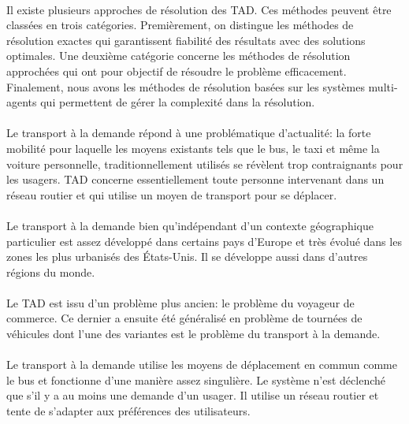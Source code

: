 \documentclass{article}
\begin{document}
\paragraph{}
Il existe plusieurs approches de résolution des TAD. Ces méthodes peuvent être classées en trois catégories. Premièrement, on distingue les méthodes de résolution exactes qui garantissent fiabilité des résultats avec des solutions optimales. Une deuxième catégorie concerne les méthodes de résolution approchées qui ont pour objectif de résoudre le problème efficacement. Finalement, nous avons les méthodes de résolution basées sur les systèmes multi-agents qui permettent de gérer la complexité dans la résolution.

\paragraph{}
Le transport à la demande répond à une problématique d’actualité: la forte mobilité pour laquelle les moyens existants tels que le bus, le taxi et même la voiture personnelle, traditionnellement utilisés se révèlent trop contraignants pour les usagers. TAD concerne essentiellement toute personne intervenant dans un réseau routier et qui utilise un moyen de transport pour se déplacer.

\paragraph{}
Le transport à la demande bien qu'indépendant d'un contexte géographique particulier est assez développé dans certains pays d'Europe et très évolué dans les zones les plus urbanisés des États-Unis. Il se développe aussi dans d'autres régions du monde.

\paragraph{}
Le TAD est issu d'un problème plus ancien: le problème du voyageur de commerce. Ce dernier a ensuite été généralisé en problème de tournées de véhicules dont l'une des variantes est le problème du transport à la demande.

\paragraph{}
Le transport à la demande utilise les moyens de déplacement en commun comme le bus et fonctionne d'une manière assez singulière. Le système n'est déclenché que s'il y a au moins une demande d'un usager. Il utilise un réseau routier et tente de s'adapter aux préférences des utilisateurs.
\end{document}
